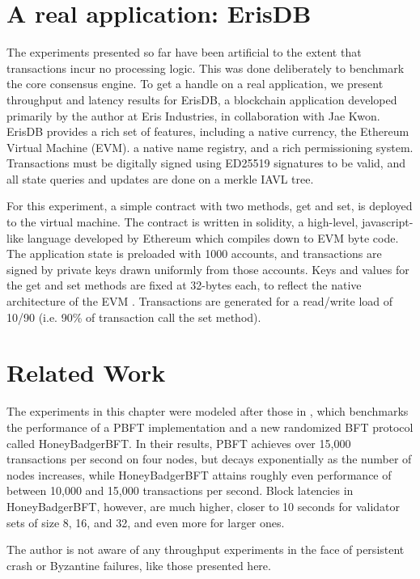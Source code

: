 \ifx
\section{A real application: ErisDB}

The experiments presented so far have been artificial to the extent that transactions incur no processing logic.
This was done deliberately to benchmark the core consensus engine. 
To get a handle on a real application, we present throughput and latency results for ErisDB, 
a blockchain application developed primarily by the author at Eris Industries, in collaboration with Jae Kwon.
ErisDB provides a rich set of features, including a native currency, the Ethereum Virtual Machine (EVM).
a native name registry, and a rich permissioning system.
Transactions must be digitally signed using ED25519 signatures to be valid, and all state queries and updates are done on a merkle IAVL tree.

For this experiment, a simple contract with two methods, get and set, is deployed to the virtual machine.
The contract is written in solidity, a high-level, javascript-like language developed by Ethereum which compiles down to EVM byte code.
The application state is preloaded with 1000 accounts, and transactions are signed by private keys drawn uniformly from those accounts.
Keys and values for the get and set methods are fixed at 32-bytes each, to reflect the native architecture of the EVM \cite{ethereum_yellow_paper}.
Transactions are generated for a read/write load of 10/90 (i.e. 90\% of transaction call the set method).

\fi

\section{Related Work}

The experiments in this chapter were modeled after those in \cite{honeybadger},
which benchmarks the performance of a PBFT implementation and a new randomized BFT protocol called HoneyBadgerBFT.
In their results, PBFT achieves over 15,000 transactions per second on four nodes,
but decays exponentially as the number of nodes increases, while HoneyBadgerBFT attains roughly even performance
of between 10,000 and 15,000 transactions per second.
Block latencies in HoneyBadgerBFT, however, are much higher, 
closer to 10 seconds for validator sets of size 8, 16, and 32, and even more for larger ones.

The author is not aware of any throughput experiments in the face of persistent crash or Byzantine failures,
like those presented here.

